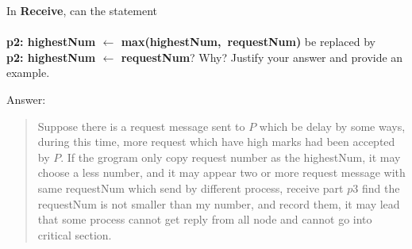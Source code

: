 \documentclass{article}
\begin{document}
\begin{Question} 
\clearpage
\begin{Subquestion}
    In \textbf{Receive}, can the statement\\\\
    \vspace{1ex}
    \textbf{p2: highestNum $\leftarrow$ max(highestNum,\ requestNum)} be replaced by\\
    \vspace{1ex}
    \textbf{p2: highestNum $\leftarrow$ requestNum}? Why? Justify your answer and provide an example.
    
\begin{answer}
    Answer:
    \begin{quote}
        Suppose there is a request message sent to $P$ which be delay by some ways, during this time, more request which have high marks had been accepted by $P$. If the grogram only copy request number as the highestNum, it may choose a less number, and it may appear two or more request message with same requestNum which send by different process, receive part $p3$ find the requestNum is not smaller than my number, and record them, it may lead that some process cannot get reply from all node and cannot go into critical section.\\ 
    \end{quote}
\end{answer}
\end{Subquestion}
\end{Question}


\clearpage
\setcounter{question}{2}
\end{document}
